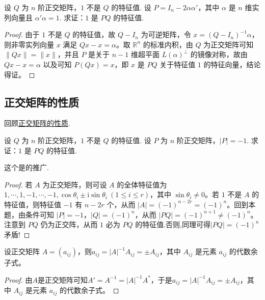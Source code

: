 \documentclass[../../main.tex]{subfiles}%
\begin{document}
\begin{proposition}\label{proposition:例9.44}
设 \(Q\) 为 \(n\) 阶正交矩阵，\(1\) 不是 \(Q\) 的特征值. 设 \(P = I_n - 2\alpha\alpha'\)，其中 \(\alpha\) 是 \(n\) 维实列向量且 \(\alpha'\alpha = 1\). 求证：\(1\) 是 \(PQ\) 的特征值.
\end{proposition}
\begin{proof}

由于 \(1\) 不是 \(Q\) 的特征值，故 \(Q - I_n\) 为可逆矩阵，令 \(x = (Q - I_n)^{-1}\alpha\)，则非零实列向量 \(x\) 满足 \(Qx - x = \alpha\)。取 \(\mathbb{R}^n\) 的标准内积，由 \(Q\) 为正交矩阵可知 \(\|Qx\| = \|x\|\)，并且 \(P\) 是关于 \(n - 1\) 维超平面 \(L(\alpha)^{\perp}\) 的镜像对称，故由 \(Qx - x = \alpha\) 以及可知 \(P(Qx) = x\)，即 \(x\) 是 \(PQ\) 关于特征值 \(1\) 的特征向量，结论得证。

\end{proof}


\subsection{正交矩阵的性质}

回顾\hyperref[theorem:正交矩阵的基本性质1]{正交矩阵的性质}.

\begin{proposition}\label{proposition:例9.44的推广}
设 \(Q\) 为 \(n\) 阶正交矩阵，\(1\) 不是 \(Q\) 的特征值. 设 \(P\) 为 \(n\) 阶正交矩阵，\(\vert P\vert = - 1\). 求证：\(1\) 是 \(PQ\) 的特征值.
\end{proposition}
\begin{remark}
这个是的推广.
\end{remark}
\begin{proof}

若 \(A\) 为正交矩阵，则可设 \(A\) 的全体特征值为 \(1,\cdots,1,-1,\cdots,-1,\cos\theta_i\pm\mathrm{i}\sin\theta_i\ (1\leqslant  i \leqslant  r)\)，其中 \(\sin\theta_i\neq0\)。若 \(1\) 不是 \(A\) 的特征值，则特征值 \(-1\) 有 \(n - 2r\) 个，从而 \(\vert A\vert = (-1)^{n - 2r}=(-1)^n\)。回到本题，由条件可知 \(\vert P\vert = - 1\)，\(\vert Q\vert = (-1)^n\)，从而 \(\vert PQ\vert = (-1)^{n + 1}\neq(-1)^n\)。注意到 \(PQ\) 仍为正交阵，从而 \(1\) 必为 \(PQ\) 的特征值.否则,同理可得$|PQ|=(-1)^n$矛盾!

\end{proof}

\begin{proposition}\label{proposition:正交阵元素的性质}
设正交矩阵 \(A = (a_{ij})\)，则\(a_{ij} = \vert A\vert^{-1}A_{ij} = \pm A_{ij}\)，其中 \(A_{ij}\) 是元素 \(a_{ij}\) 的代数余子式。
\end{proposition}
\begin{proof}

由$A$是正交矩阵可知\(A' = A^{-1} = \vert A\vert^{-1}A^*\)，于是\(a_{ij} = \vert A\vert^{-1}A_{ij} = \pm A_{ij}\)，其中 \(A_{ij}\) 是元素 \(a_{ij}\) 的代数余子式。

\end{proof}
\end{document}

